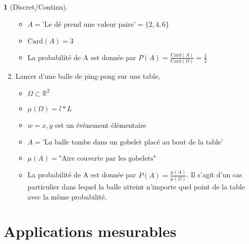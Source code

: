 \documentclass[8pt,notheorems]{beamer}
\theoremstyle{definition}
\theoremstyle{example}
\newtheorem{example}{\translate{Exemple}}
\theoremstyle{mystyle}
\theoremstyle{plain}
\begin{document}
\begin{frame}[allowframebreaks]
\begin{example}[Discret/Continu]
\begin{enumerate}
\begin{itemize}
\item $A = \text{'Le dé prend une valeur paire'}=\{2,4,6\}$
\item $\text{Card}(A)=3$
\item La probabilité de A est donnée par $P(A)=\frac{\text{Card}(A)}{\text{Card}(\Omega)}=\frac{1}{2}$
\end{itemize}
\item Lancer d'une balle de ping-pong sur une table,
\begin{itemize}
\item $\Omega\subset\mathbb{R}^{2}$
\item $\mu(\Omega)=l*L$
\item $w={x,y}$ est un évènement élémentaire
\item $A = \text{'La balle tombe dans un gobelet placé au bout de la table'}$
\item $\mu(A)=\text{"Aire couverte par les gobelets"}$
\item La probabilité de A est donnée par $P(A)=\frac{\mu(A)}{\mu(\Omega)}$. Il s'agit d'un cas particulier dans lequel la balle atteint n'importe quel point de la table avec la même probabilité.
\end{itemize}
\end{enumerate}
\end{example}
\end{frame}
\section{Applications mesurables}
\end{document}
